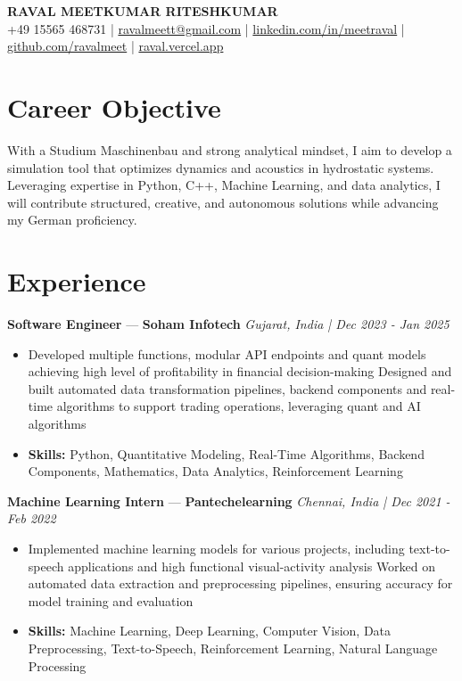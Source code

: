 \documentclass[a4paper,10pt]{article}
\begin{document}
\begin{center}
  {\Large\bfseries RAVAL MEETKUMAR RITESHKUMAR}\\[2pt]
  {\small +49 15565 468731 \;|\; \href{mailto:ravalmeett@gmail.com}{ravalmeett@gmail.com} \;|\; \href{https://www.linkedin.com/in/meetraval/}{linkedin.com/in/meetraval} \;|\; \href{https://github.com/ravalmeet}{github.com/ravalmeet} \;|\; \href{https://raval.vercel.app/}{raval.vercel.app}}
\end{center}
\vspace{-3pt}

\section*{Career Objective}
With a Studium Maschinenbau and strong analytical mindset, I aim to develop a simulation tool that optimizes dynamics and acoustics in hydrostatic systems. Leveraging expertise in Python, C++, Machine Learning, and data analytics, I will contribute structured, creative, and autonomous solutions while advancing my German proficiency.\par

\section*{Experience}
\textbf{Software Engineer} — \textbf{Soham Infotech} \hfill \textit{Gujarat, India \;|\; Dec 2023 - Jan 2025}\par
\vspace{1pt}
\begin{itemize}
  \item Developed multiple functions, modular API endpoints and quant models achieving high level of profitability in financial decision-making Designed and built automated data transformation pipelines, backend components and real-time algorithms to support trading operations, leveraging quant and AI algorithms
  \item \textbf{Skills:} Python, Quantitative Modeling, Real-Time Algorithms, Backend Components, Mathematics, Data Analytics, Reinforcement Learning
\end{itemize}
\vspace{3pt}
\textbf{Machine Learning Intern} — \textbf{Pantechelearning} \hfill \textit{Chennai, India \;|\; Dec 2021 - Feb 2022}\par
\vspace{1pt}
\begin{itemize}
  \item Implemented machine learning models for various projects, including text-to-speech applications and high functional visual-activity analysis Worked on automated data extraction and preprocessing pipelines, ensuring accuracy for model training and evaluation
  \item \textbf{Skills:} Machine Learning, Deep Learning, Computer Vision, Data Preprocessing, Text-to-Speech, Reinforcement Learning, Natural Language Processing
\end{itemize}
\end{document}
